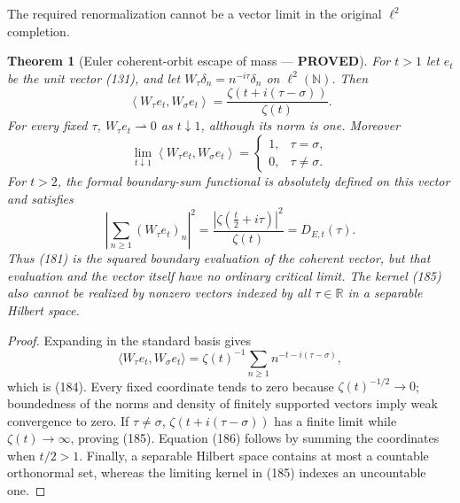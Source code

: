 \documentclass[11pt]{article}
\newtheorem{theorem}{Theorem}
\newcommand{\PROVED}{\textcolor{green!45!black}{\textbf{PROVED}}}
\begin{document}
The required renormalization cannot be a vector limit in the original
$\ell^2$ completion.

\begin{theorem}[Euler coherent-orbit escape of mass --- \PROVED]
For $t>1$ let $e_t$ be the unit vector (131), and let
$W_\tau\delta_n=n^{-i\tau}\delta_n$ on $\ell^2(\mathbb N)$.  Then
\begin{equation}
 \left\langle W_\tau e_t,W_\sigma e_t\right\rangle
 =\frac{\zeta(t+i(\tau-\sigma))}{\zeta(t)}.           \tag{184}
\end{equation}
For every fixed $\tau$, $W_\tau e_t\rightharpoonup0$ as $t\downarrow1$,
although its norm is one.  Moreover
\begin{equation}
 \lim_{t\downarrow1}
 \left\langle W_\tau e_t,W_\sigma e_t\right\rangle
 =\begin{cases}1,&\tau=\sigma,\\0,&\tau\ne\sigma.
 \end{cases}                                          \tag{185}
\end{equation}
For $t>2$, the formal boundary-sum functional is absolutely defined on this
vector and satisfies
\begin{equation}
 \left|\sum_{n\ge1}(W_\tau e_t)_n\right|^2
 =\frac{|\zeta(\frac t2+i\tau)|^2}{\zeta(t)}
 =D_{E,t}(\tau).                                      \tag{186}
\end{equation}
Thus (181) is the squared boundary evaluation of the coherent vector, but
that evaluation and the vector itself have no ordinary critical limit.
The kernel (185) also cannot be realized by nonzero vectors indexed by all
$\tau\in\mathbb R$ in a separable Hilbert space.
\end{theorem}

\begin{proof}
Expanding in the standard basis gives
\[
 \langle W_\tau e_t,W_\sigma e_t\rangle
 =\zeta(t)^{-1}\sum_{n\ge1}n^{-t-i(\tau-\sigma)},
\]
which is (184).  Every fixed coordinate tends to zero because
$\zeta(t)^{-1/2}\to0$; boundedness of the norms and density of finitely
supported vectors imply weak convergence to zero.  If $\tau\ne\sigma$,
$\zeta(t+i(\tau-\sigma))$ has a finite limit while $\zeta(t)\to\infty$,
proving (185).  Equation (186) follows by summing the coordinates when
$t/2>1$.  Finally, a separable Hilbert space contains at most a countable
orthonormal set, whereas the limiting kernel in (185) indexes an uncountable
one.
\end{proof}
\end{document}
